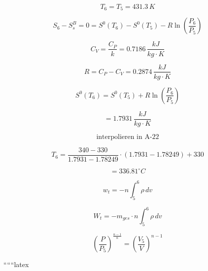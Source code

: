 \[
T_6 = T_5 = 431.3 \, K
\]

\[
S_6 - S_s^B = 0 = S^0(T_6) - S^0(T_5) - R \ln \left( \frac{P_6}{P_5} \right)
\]

\[
C_V = \frac{C_P}{k} = 0.7186 \, \frac{kJ}{kg \cdot K}
\]

\[
R = C_P - C_V = 0.2874 \, \frac{kJ}{kg \cdot K}
\]

\[
S^0(T_6) = S^0(T_5) + R \ln \left( \frac{P_6}{P_5} \right)
\]

\[
= 1.7931 \, \frac{kJ}{kg \cdot K}
\]

\[
\text{interpolieren in A-22}
\]

\[
T_6 = \frac{340 - 330}{1.7931 - 1.78249} \cdot (1.7931 - 1.78249) + 330
\]

\[
= 336.81^\circ C
\]

\[
w_t = -n \int_5^6 \rho \, dv
\]

\[
W_t = -m_{ges} \cdot n \int_5^6 \rho \, dv
\]

\[
\left( \frac{P}{P_5} \right)^{\frac{n-1}{n}} = \left( \frac{V_5}{V} \right)^{n-1}
\]

``````latex